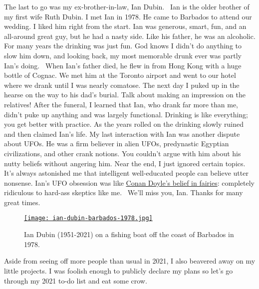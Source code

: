 The last to go was my ex-brother-in-law, Ian Dubin. ~Ian is the older
brother of my first wife Ruth Dubin. I met Ian in 1978. He came to
Barbados to attend our wedding. I liked him right from the start. Ian
was generous, smart, fun, and an all-around great guy, but he had a
nasty side. Like his father, he was an alcoholic. For many years the
drinking was just fun. God knows I didn't do anything to slow him down,
and looking back, my most memorable drunk ever was partly Ian's doing.~
When Ian's father died, he flew in from Hong Kong with a huge bottle of
Cognac. We met him at the Toronto airport and went to our hotel where we
drank until I was nearly comatose. The next day I puked up in the hearse
on the way to his dad's burial. Talk about making an impression on the
relatives! After the funeral, I learned that Ian, who drank far more
than me, didn't puke up anything and was largely functional. Drinking is
like everything; you get better with practice. As the years rolled on
the drinking slowly ruined and then claimed Ian's life. My last
interaction with Ian was another dispute about UFOs. He was a firm
believer in alien UFOs, predynastic Egyptian civilizations, and other
crank notions. You couldn't argue with him about his nutty beliefs
without angering him. Near the end, I just ignored certain topics. It's
always astonished me that intelligent well-educated people can believe
utter nonsense. Ian's UFO obsession was like
\href{https://brewminate.com/sir-arthur-conan-doyle-and-the-cottingly-fairies-hoax-of-1917-1921/}{Conan
Doyle's belief in fairies}: completely ridiculous to hard-ass skeptics
like me.~ We'll miss you, Ian. Thanks for many great times.

\begin{SCfigure}
\centering
\href{https://conceptcontrol.smugmug.com/People/Inlaws-Outlaws-and-Friends/i-4bqMBNB/A}{\texttt{[image: ian-dubin-barbados-1978.jpg]}}
\caption[Ian Dubin (1951-2021)]{Ian Dubin (1951-2021) on a fishing boat off the coast of Barbados in 1978.}
\label{fig:7274x2}
\end{SCfigure}


Aside from seeing off more people than usual in 2021, I also beavered
away on my little projects. I was foolish enough to publicly declare my
plans so let's go through my 2021 to-do list and eat some crow.

